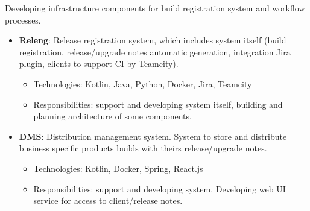 \documentclass{cv}
\begin{document}
\begin{cvblock}{%
  }

  Developing infrastructure components for build registration 
  system and workflow processes.

  \begin{itemize}
    \item \textbf{Releng}: Release registration system, which includes system itself
      (build registration, release/upgrade notes automatic generation,
      integration Jira plugin, clients to support CI by Teamcity).
      \begin{itemize}
        \item Technologies: Kotlin, Java, Python, Docker, Jira, Teamcity
        \item Responsibilities: support and developing system itself,
          building and planning architecture of some components.
      \end{itemize}
    \item \textbf{DMS}: Distribution management system. System to store and distribute
      business specific products builds with theirs release/upgrade notes.
      \begin{itemize}
        \item Technologies: Kotlin, Docker, Spring, React.js
        \item Responsibilities: support and developing system. Developing web
          UI service for access to client/release notes.
      \end{itemize}
  \end{itemize}
\end{cvblock}

\vspace{2em}
\end{document}

